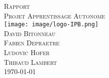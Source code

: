 \documentclass[a4paper, 11pt]{article}
\begin{document}
\begin{titlepage}
\begin{center}
\textsc{\huge Rapport}\\[3cm]
\textsc{\Huge Projet Apprentissage Autonome}\\[3cm]
\texttt{[image: image/logo-IPB.png]}\\[3cm]
\textsc{\Large David Bitonneau}\\
\textsc{\Large Fabien Depraetre}\\
\textsc{\Large Ludovic Hofer}\\
\textsc{\Large Thibaud Lambert}\\[3cm]
\textsc{\Large \today}\\
\end{center}
\end{titlepage}

\clearpage
\tableofcontents
\clearpage






\end{document}
